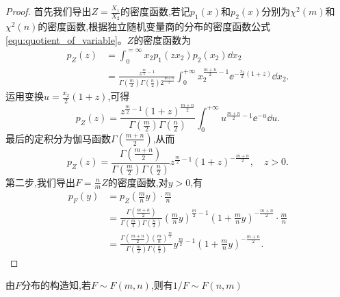 \begin{proof}
    首先我们导出$Z=\frac{X_1}{X_2}$的密度函数,若记$p_1(x)$和$p_2(x)$分别为$\chi^2(m)$和$\chi^2(n)$的密度函数,根据独立随机变量商的分布的密度函数公式\ref{equ:quotient_of_variable}。$Z$的密度函数为
    \begin{align*}
        p_Z(z) & =\int_0^{=\infty}x_2p_1(zx_2)p_2(x_2)\dd x_2                                                                                                                                       \\
               & =\frac{z^{\frac{m}{2}-1}}{\Gamma \left( \frac{m}{2} \right) \Gamma \left( \frac{n}{2} \right) 2^{\frac{m+n}{2}}}\int_0^{+\infty}x_2^{\frac{m+n}2-1}\ee^{-\frac{x_2}2(1+z)}\dd x_2.
    \end{align*}
    运用变换$u=\frac{x_2}2(1+z)$,可得
    \[p_Z(z)=\frac{z^{\frac{m}{2}-1}\left( 1+z \right) ^{\frac{m+n}{2}}}{\Gamma \left( \frac{m}{2} \right) \Gamma \left( \frac{n}{2} \right)}\int_0^{+\infty}u^{\frac{m+n}2-1}\ee^{-u}\dd u.\]
    最后的定积分为伽马函数$\Gamma\left(\frac{m+n}2\right)$,从而
    \[
        p_Z\left( z \right) =\frac{\Gamma \left( \frac{m+n}{2} \right)}{\Gamma \left( \frac{m}{2} \right) \Gamma \left( \frac{n}{2} \right)}z^{\frac{m}{2}-1}\left( 1+z \right) ^{-\frac{m+n}{2}},\quad z>0.
    \]
    第二步,我们导出$F=\frac nm Z$的密度函数,对$y>0$,有
    \begin{align*}
        p_F\left( y \right) & =p_Z\left( \frac{m}{n}y \right) \cdot \frac{m}{n}                                                                                                                                                                            \\
                            & =\frac{\Gamma \left( \frac{m+n}{2} \right)}{\Gamma \left( \frac{m}{2} \right) \Gamma \left( \frac{n}{2} \right)}\left( \frac{m}{n}y \right) ^{\frac{m}{2}-1}\left( 1+\frac{m}{n}y \right) ^{-\frac{m+n}{2}}\cdot \frac{m}{n} \\
                            & =\frac{\Gamma \left( \frac{m+n}{2} \right) \left( \frac{m}{n} \right) ^{\frac{m}{2}}}{\Gamma \left( \frac{m}{2} \right) \Gamma \left( \frac{n}{2} \right)}y^{\frac{m}{2}-1}\left( 1+\frac{m}{n}y \right) ^{-\frac{m+n}{2}}.
    \end{align*}
\end{proof}

\begin{remark}
    由$F$分布的构造知,若$F\sim F(m,n)$,则有$1/F\sim F(n,m)$
\end{remark}

